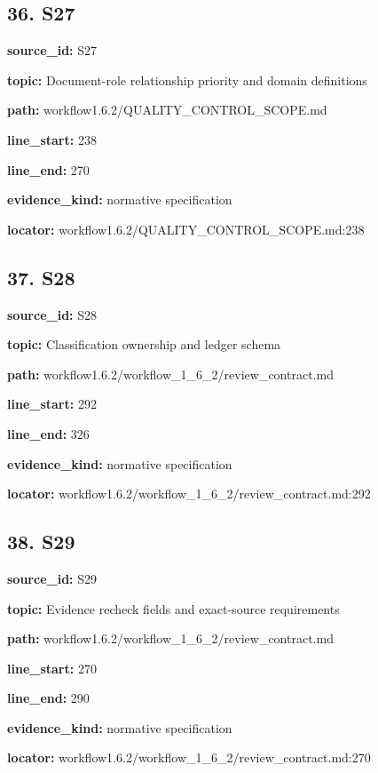 \documentclass[10pt,a4paper]{article}
\begin{document}
\subsection*{36.\allowbreak{} S27}
\textbf{source\_\allowbreak{}id:} S27\par
\textbf{topic:} Document-\allowbreak{}role relationship priority and domain definitions\par
\textbf{path:} workflow1.\allowbreak{}6.\allowbreak{}2/\allowbreak{}QUALITY\_\allowbreak{}CONTROL\_\allowbreak{}SCOPE.\allowbreak{}md\par
\textbf{line\_\allowbreak{}start:} 238\par
\textbf{line\_\allowbreak{}end:} 270\par
\textbf{evidence\_\allowbreak{}kind:} normative specification\par
\textbf{locator:} workflow1.\allowbreak{}6.\allowbreak{}2/\allowbreak{}QUALITY\_\allowbreak{}CONTROL\_\allowbreak{}SCOPE.\allowbreak{}md:238\par
\subsection*{37.\allowbreak{} S28}
\textbf{source\_\allowbreak{}id:} S28\par
\textbf{topic:} Classification ownership and ledger schema\par
\textbf{path:} workflow1.\allowbreak{}6.\allowbreak{}2/\allowbreak{}workflow\_\allowbreak{}1\_\allowbreak{}6\_\allowbreak{}2/\allowbreak{}review\_\allowbreak{}contract.\allowbreak{}md\par
\textbf{line\_\allowbreak{}start:} 292\par
\textbf{line\_\allowbreak{}end:} 326\par
\textbf{evidence\_\allowbreak{}kind:} normative specification\par
\textbf{locator:} workflow1.\allowbreak{}6.\allowbreak{}2/\allowbreak{}workflow\_\allowbreak{}1\_\allowbreak{}6\_\allowbreak{}2/\allowbreak{}review\_\allowbreak{}contract.\allowbreak{}md:292\par
\subsection*{38.\allowbreak{} S29}
\textbf{source\_\allowbreak{}id:} S29\par
\textbf{topic:} Evidence recheck fields and exact-\allowbreak{}source requirements\par
\textbf{path:} workflow1.\allowbreak{}6.\allowbreak{}2/\allowbreak{}workflow\_\allowbreak{}1\_\allowbreak{}6\_\allowbreak{}2/\allowbreak{}review\_\allowbreak{}contract.\allowbreak{}md\par
\textbf{line\_\allowbreak{}start:} 270\par
\textbf{line\_\allowbreak{}end:} 290\par
\textbf{evidence\_\allowbreak{}kind:} normative specification\par
\textbf{locator:} workflow1.\allowbreak{}6.\allowbreak{}2/\allowbreak{}workflow\_\allowbreak{}1\_\allowbreak{}6\_\allowbreak{}2/\allowbreak{}review\_\allowbreak{}contract.\allowbreak{}md:270\par
\end{document}
